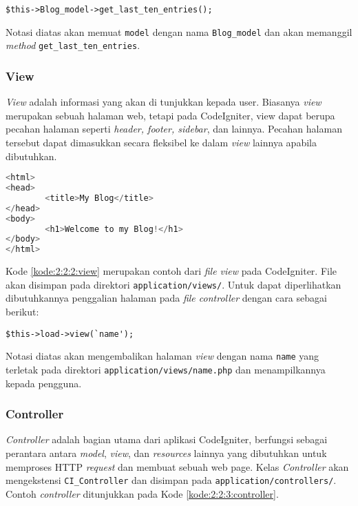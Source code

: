 \begin{center}
	\verb|$this->Blog_model->get_last_ten_entries();|
\end{center}

Notasi diatas akan memuat \verb|model| dengan nama \verb|Blog_model| dan akan memanggil \textit{method} \verb|get_last_ten_entries|.

\subsubsection{View}
\label{sub:2:2:2:View}

\textit{View} adalah informasi yang akan di tunjukkan kepada user. Biasanya \textit{view} merupakan sebuah halaman web, tetapi pada CodeIgniter, view dapat berupa pecahan halaman seperti \textit{header, footer, sidebar}, dan lainnya. Pecahan halaman tersebut dapat dimasukkan secara fleksibel ke dalam \textit{view} lainnya apabila dibutuhkan.

\begin{lstlisting}[language=php, caption={Contoh \textit{view}}, label={kode:2:2:2:view}]
<html>
<head>
        <title>My Blog</title>
</head>
<body>
        <h1>Welcome to my Blog!</h1>
</body>
</html>
\end{lstlisting}

Kode \ref{kode:2:2:2:view} merupakan contoh dari \textit{file view} pada CodeIgniter. File akan disimpan pada direktori \verb|application/views/|. Untuk dapat diperlihatkan dibutuhkannya penggalian halaman pada \textit{file controller} dengan cara sebagai berikut:

\begin{center}
	\verb|$this->load->view(`name');|
\end{center}

Notasi diatas akan mengembalikan halaman \textit{view} dengan nama \verb|name| yang terletak pada direktori \verb|application/views/name.php| dan menampilkannya kepada pengguna.

\subsubsection{Controller}
\label{sub:2:2:3:Controller}

\textit{Controller} adalah bagian utama dari aplikasi CodeIgniter, berfungsi sebagai perantara antara \textit{model}, \textit{view}, dan \textit{resources} lainnya yang dibutuhkan untuk memproses HTTP \textit{request} dan membuat sebuah web page. Kelas \textit{Controller} akan mengekstensi \verb|CI_Controller| dan disimpan pada \verb|application/controllers/|. Contoh \textit{controller} ditunjukkan pada Kode \ref{kode:2:2:3:controller}.

